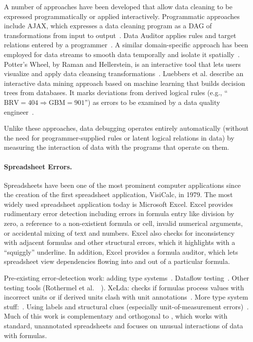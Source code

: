 A number of approaches have been developed that allow data cleaning to
be expressed programmatically or applied interactively. Programmatic
approaches include AJAX, which expresses a data cleaning program as a
DAG of transformations from input to
output~\cite{Galhardas:2000:AED:342009.336568}. Data Auditor applies
rules and target relations entered by a
programmer~\cite{Golab:2010:DAE:1920841.1921060}. A similar
domain-specific approach has been employed for data streams to smooth
data temporally and isolate it spatially~\cite{1617508}. Potter's
Wheel, by Raman and Hellerstein, is an interactive tool that lets
users visualize and apply data cleansing
transformations~\cite{Raman:2001:PWI:645927.672045}. 
Luebbers et al. describe an interactive data mining approach based on
machine learning that builds decision trees from databases. It marks
deviations from derived logical rules (e.g., ``$\mbox{BRV} =
404 \Rightarrow \mbox{GBM} = 901$'') as errors to be examined by a
data quality engineer~\cite{Luebbers:2003:SDD:1315451.1315499}.

Unlike these approaches, data debugging operates entirely
automatically (without the need for programmer-supplied rules or
latent logical relations in data) by measuring the interaction of data
with the programs that operate on them.
 

\paragraph{Spreadsheet Errors.}
Spreadsheets have been one of the most prominent computer applications
since the creation of the first spreadsheet application, VisiCalc, in
1979. The most widely used spreadsheet application today is Microsoft
Excel. Excel provides rudimentary error detection including errors in
formula entry like division by zero, a reference to a non-existient
formula or cell, invalid numerical arguments, or accidental mixing of
text and numbers.
Excel also checks for inconsistency with adjacent formulas and other
structural errors, which it highlights with a ``squiggly'' underline. In addition, Excel provides a formula auditor, which lets spreadsheet view dependencies flowing into and out of a particular formula.

Pre-existing error-detection work: adding type
systems~\cite{DBLP:conf/kbse/AhmadAGK03}. Dataflow
testing~\cite{fisher2006scaling}. Other testing tools (Rothermel et
al.\
~\cite{rothermel1998you,rothermel2001methodology,Carver:2006:EET:1159733.1159775}). XeLda:
checks if formulas process values with incorrect units or if derived
units clash with unit
annotations~\cite{Antoniu:2004:VUC:998675.999448}.  More type system
stuff:~\cite{Erwig:2005:AGM:1062455.1062494}. Using labels and
structural clues (especially unit-of-measurement
errors)~\cite{Chambers:2010:RSL:1860134.1860346}. Much of this work is
complementary and orthogonal to \checkcell{}, which works with
standard, unannotated spreadsheets and focuses on unusual interactions of
data with formulas.


